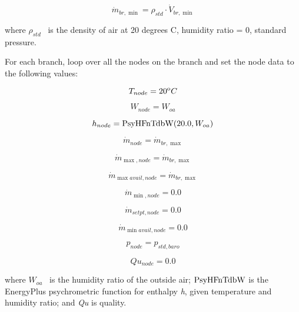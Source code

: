 \begin{equation}
{\dot m_{br,\min }} = {\rho_{std}} \cdot {\dot V_{br,\min }}
\end{equation}

where \({\rho_{std}}\) ~is the density of air at 20 degrees C, humidity ratio = 0, standard pressure.

For each branch, loop over all the nodes on the branch and set the node data to the following values:

\begin{equation}
{T_{node}} = {20^{\rm{o}}}C
\end{equation}

\begin{equation}
{W_{node}} = {W_{oa}}
\end{equation}

\begin{equation}
{h_{node}} = {\mathop{\rm PsyHFnTdbW}\nolimits} {\rm{(}}20.0,{W_{oa}}{\rm{)}}
\end{equation}

\begin{equation}
{\dot m_{node}} = {\dot m_{br,\max }}
\end{equation}

\begin{equation}
{\dot m_{\max ,node}} = {\dot m_{br,\max }}
\end{equation}

\begin{equation}
{\dot m_{\max avail,node}} = {\dot m_{br,\max }}
\end{equation}

\begin{equation}
{\dot m_{\min ,node}} = 0.0
\end{equation}

\begin{equation}
{\dot m_{setpt,node}} = 0.0
\end{equation}

\begin{equation}
{\dot m_{\min avail,node}} = 0.0
\end{equation}

\begin{equation}
{p_{node}} = {p_{std,baro}}
\end{equation}

\begin{equation}
Q{u_{node}} = 0.0
\end{equation}

where \({W_{oa}}\) ~is the humidity ratio of the outside air; \({\rm{PsyHFnTdbW}}\) is the EnergyPlus psychrometric function for enthalpy \emph{h}, given temperature and humidity ratio; and \emph{Qu} is quality.

